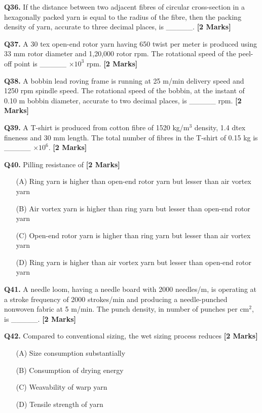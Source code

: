 \documentclass[11pt]{article}
\newcommand{\questionb}[2]{
    \noindent\textbf{Q#2.} #1 \hfill \textbf{[2 Marks]}
}
\begin{document}
\questionb{If the distance between two adjacent fibres of circular cross-section in a hexagonally packed yarn is equal to the radius of the fibre, then the packing density of yarn, accurate to three decimal places, is \_\_\_\_\_.}{36}
\vspace{0.5cm}

\questionb{A 30 tex open-end rotor yarn having 650 twist per meter is produced using 33 mm rotor diameter and 1,20,000 rotor rpm. The rotational speed of the peel-off point is \_\_\_\_\_ \(\times 10^3\) rpm.}{37}
\vspace{0.5cm}

\questionb{A bobbin lead roving frame is running at 25 m/min delivery speed and 1250 rpm spindle speed. The rotational speed of the bobbin, at the instant of 0.10 m bobbin diameter, accurate to two decimal places, is \_\_\_\_\_ rpm.}{38}
\vspace{0.5cm}

\questionb{A T-shirt is produced from cotton fibre of 1520 kg/m\(^3\) density, 1.4 dtex fineness and 30 mm length. The total number of fibres in the T-shirt of 0.15 kg is \_\_\_\_\_ \(\times 10^6\).}{39}
\vspace{0.5cm}

\questionb{Pilling resistance of}{40}
\begin{enumerate}
    \item[(A)] Ring yarn is higher than open-end rotor yarn but lesser than air vortex yarn  
    \item[(B)] Air vortex yarn is higher than ring yarn but lesser than open-end rotor yarn  
    \item[(C)] Open-end rotor yarn is higher than ring yarn but lesser than air vortex yarn  
    \item[(D)] Ring yarn is higher than air vortex yarn but lesser than open-end rotor yarn  
\end{enumerate}
\vspace{0.5cm}

\questionb{A needle loom, having a needle board with 2000 needles/m, is operating at a stroke frequency of 2000 strokes/min and producing a needle-punched nonwoven fabric at 5 m/min. The punch density, in number of punches per cm\(^2\), is \_\_\_\_\_.}{41}
\vspace{0.5cm}

\questionb{Compared to conventional sizing, the wet sizing process reduces}{42}
\begin{enumerate}
    \item[(A)] Size consumption substantially  
    \item[(B)] Consumption of drying energy  
    \item[(C)] Weavability of warp yarn  
    \item[(D)] Tensile strength of yarn  
\end{enumerate}
\vspace{0.5cm}
\end{document}
